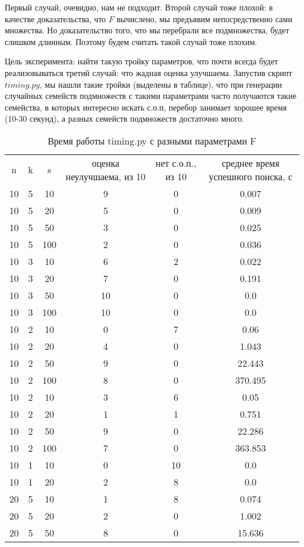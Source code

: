 \documentclass{article}
\begin{document}
    Первый случай, очевидно, нам не подходит. Второй случай тоже плохой: в качестве доказательства, что $F$ вычислено, мы предъявим непосредственно сами множества. Но доказательство того, что мы перебрали все подмножества, будет слишком длинным. Поэтому будем считать такой случай тоже плохим.

    Цель эксперимента: найти такую тройку параметров, что почти всегда будет реализовываться третий случай: что жадная оценка улучшаема. Запустив скрипт $timing.py$, мы нашли такие тройки (выделены в таблице), что при генерации случайных семейств подмножеств с такими параметрами часто получаются такие семейства, в которых интересно искать с.о.п, перебор занимает хорошее время (10-30 секунд), а разных семейств подмножеств достаточно много.

\begin{table}
\caption{Время работы timing.py с разными параметрами F}
\begin{center}
\begin{tabular}{cccccc}
n & k & s & оценка неулучшаема, из 10 & нет с.о.п., из 10 & среднее время успешного поиска, с\\
10 & 5 & 10 & 9 & 0 & 0.007 \\
10 & 5 & 20 & 5 & 0 & 0.009\\
10 & 5 & 50 & 3 & 0 & 0.025\\
10 & 5 & 100 & 2 & 0 & 0.036\\
10 & 3 & 10 & 6 & 2 & 0.022\\
10 & 3 & 20 & 7 & 0 & 0.191\\
10 & 3 & 50 & 10 & 0 & 0.0\\
10 & 3 & 100 & 10 & 0 & 0.0\\
10 & 2 & 10 & 0 & 7 & 0.06\\
10 & 2 & 20 & 4 & 0 & 1.043\\
10 & 2 & 50 & 9 & 0 & 22.443\\
10 & 2 & 100 & 8 & 0 & 370.495\\
10 & 2 & 10 & 3 & 6 & 0.05\\
10 & 2 & 20 & 1 & 1 & 0.751\\
10 & 2 & 50 & 9 & 0 & 22.286\\
10 & 2 & 100 & 7 & 0 & 363.853\\
10 & 1 & 10 & 0 & 10 & 0.0\\
10 & 1 & 20 & 2 & 8 & 0.0\\
20 & 5 & 10 & 1 & 8 & 0.074\\
20 & 5 & 20 & 2 & 0 & 1.002\\
20 & 5 & 50 & 8 & 0 & 15.636\\

\end{tabular}
\end{center}
\end{table}
\end{document}

